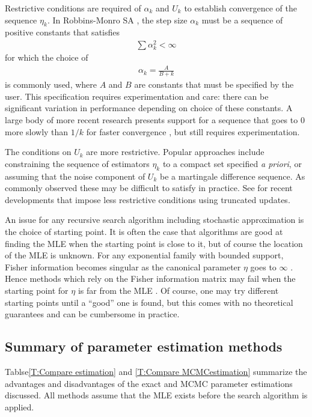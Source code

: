 Restrictive conditions are required of $\alpha_k$ and $U_k$ to establish convergence 
of the sequence $\eta_k$.  
In Robbins-Monro SA \citep{Robbins-Monro}, the step size $\alpha_k$ must be a sequence 
of positive constants 
that satisfies 
\begin{align*}
	\sum \alpha_k^2 < \infty
\end{align*}
for which the choice of
\begin{align} \label{E:SA step size}
	\alpha_k = \frac{A}{B + k}
\end{align}
 is commonly used, where $A$ and $B$ are constants that must be specified by the user.  
This specification requires experimentation and care: there can be significant 
variation in performance depending on choice of these constants. 
A large body of more recent research presents support for a sequence that goes to 0 
more slowly than $1/k$ 
for faster convergence \citep[Chapter 11]{Kushner:1997}, but still requires 
experimentation.  

The conditions on $U_k$ are more restrictive.  Popular approaches include constraining 
the sequence of estimators $\eta_k$ to a compact set specified \emph{a priori}, 
or assuming that the noise component of $U_k$ be a martingale 
difference sequence.  As commonly observed \citep*{Chen:2002,Andrieu:2005,Liang:2010} 
these may be 
difficult to satisfy in practice.  
See \citep{Andrieu:2005,Liang:2010} for recent developments that impose less 
restrictive conditions using truncated 
updates.

An issue for any recursive search algorithm including stochastic approximation is the 
choice of starting point.  It is 
often the case that algorithms are good at finding the MLE when the starting point is 
close to it, but of course the 
location of the MLE is unknown.  For any exponential family with bounded support, 
Fisher information 
becomes singular as the canonical parameter $\eta$ goes to $\infty$ \citep*{Rinaldo:2009}.
Hence methods which rely on 
the Fisher information matrix may fail when the starting point for $\eta$ is far from 
the MLE \citep{Younes:1989,Gu:2001}.
Of course, one may try different starting points until a ``good'' one is found, but 
this comes with no theoretical guarantees and can be cumbersome in practice.

\subsection{Summary of parameter estimation methods}
Tablse\ref{T:Compare estimation} and \ref{T:Compare MCMCestimation} summarize the advantages and disadvantages of the exact and MCMC parameter estimations discussed.  
All methods assume that the MLE exists before the search algorithm is applied.

